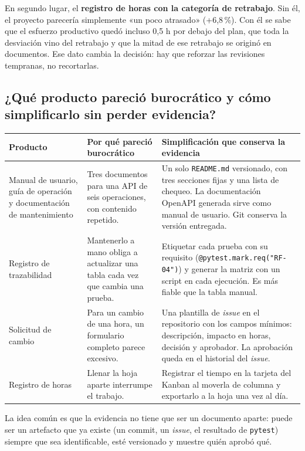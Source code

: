 \documentclass[11pt,a4paper]{article}
\newcommand{\cod}[1]{\texttt{\small #1}}
\begin{document}
En segundo lugar, el \textbf{registro de horas con la categoría de retrabajo}. Sin él, el proyecto parecería simplemente «un poco atrasado» (+6,8\,\%). Con él se sabe que el esfuerzo productivo quedó incluso 0,5 h por debajo del plan, que toda la desviación vino del retrabajo y que la mitad de ese retrabajo se originó en documentos. Ese dato cambia la decisión: hay que reforzar las revisiones tempranas, no recortarlas.

\subsection{¿Qué producto pareció burocrático y cómo simplificarlo sin perder evidencia?}
\begin{table}[H]
\centering\small
\begin{tabularx}{\linewidth}{@{}P{3.4cm} L L@{}}
\toprule
\textbf{Producto} & \textbf{Por qué pareció burocrático} & \textbf{Simplificación que conserva la evidencia} \\
\midrule
Manual de usuario, guía de operación y documentación de mantenimiento & Tres documentos para una API de seis operaciones, con contenido repetido. & Un solo \cod{README.md} versionado, con tres secciones fijas y una lista de chequeo. La documentación OpenAPI generada sirve como manual de usuario. Git conserva la versión entregada. \\
Registro de trazabilidad & Mantenerlo a mano obliga a actualizar una tabla cada vez que cambia una prueba. & Etiquetar cada prueba con su requisito (\cod{@pytest.mark.req("RF-04")}) y generar la matriz con un script en cada ejecución. Es más fiable que la tabla manual. \\
Solicitud de cambio & Para un cambio de una hora, un formulario completo parece excesivo. & Una plantilla de \emph{issue} en el repositorio con los campos mínimos: descripción, impacto en horas, decisión y aprobador. La aprobación queda en el historial del \emph{issue}. \\
Registro de horas & Llenar la hoja aparte interrumpe el trabajo. & Registrar el tiempo en la tarjeta del Kanban al moverla de columna y exportarlo a la hoja una vez al día. \\
\bottomrule
\end{tabularx}
\end{table}

La idea común es que la evidencia no tiene que ser un documento aparte: puede ser un artefacto que ya existe (un commit, un \emph{issue}, el resultado de \cod{pytest}) siempre que sea identificable, esté versionado y muestre quién aprobó qué.
\end{document}
